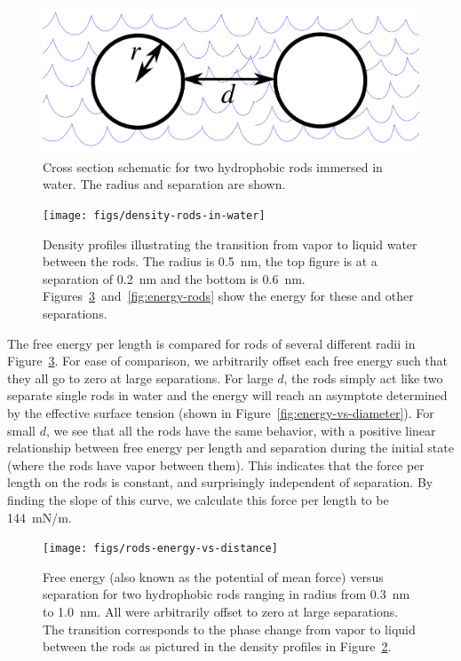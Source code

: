\documentclass[letterpaper,twocolumn,amsmath,amssymb,prb]{revtex4-1}
\begin{document}
\begin{figure}
\begin{center}
\includegraphics[width=\columnwidth]{figs/rods-diagram}
\end{center}
\caption{ Cross section schematic for two hydrophobic rods immersed in water.
The radius and separation are shown.}
\label{fig:rods}
\end{figure}

\begin{figure}
\begin{center}
\texttt{[image: figs/density-rods-in-water]}
\end{center}
\caption{ Density profiles illustrating the transition from vapor 
to liquid water between the rods. The radius is 0.5~nm, the top figure is 
at a separation of 0.2~nm and the
bottom is 0.6~nm. Figures~\ref{fig:rods-energy-vs-distance}~and~\ref{fig:energy-rods} show
the energy for these and other separations.}
\label{fig:density-rods}
\end{figure}

The free energy per length is compared for rods of several different radii
in Figure~\ref{fig:rods-energy-vs-distance}. For ease of comparison, we 
arbitrarily offset each free energy such that they all go 
to zero at large separations. For large $d$, the rods 
simply act like two separate single rods in water and the energy will
reach an asymptote determined by the effective surface tension (shown in 
Figure~\ref{fig:energy-vs-diameter}). For small $d$, we see that all the rods 
have the same behavior, with a positive linear relationship
between free energy per length and separation during the initial state 
(where the rods have vapor between them). This indicates that the force 
per length on the rods is constant, and surprisingly independent of separation. 
By finding the slope of this curve, we calculate this force per length to be 144~mN/m.

\begin{figure}
\begin{center}
\texttt{[image: figs/rods-energy-vs-distance]}
\end{center}
\caption{ Free energy (also known as the potential of mean force) 
versus separation for two hydrophobic rods ranging in radius from
0.3~nm to 1.0~nm.
All were arbitrarily offset to zero at large separations. The
transition corresponds to the phase change from
vapor to liquid between the rods as pictured in the density profiles in 
Figure~\ref{fig:density-rods}. }
\label{fig:rods-energy-vs-distance}
\end{figure}
\end{document}
